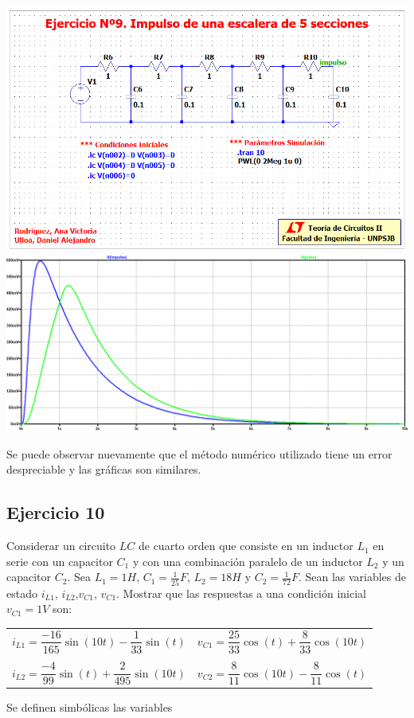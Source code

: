\documentclass[10pt,a4paper]{article} %
\begin{document}
\begin{center}
	\includegraphics[scale=0.5]{simulacion91}
	\includegraphics[scale=0.4]{simulacion92}

\end{center}
Se puede observar nuevamente que el método numérico utilizado tiene un error despreciable y las gráficas son similares. 
	\subsection{Ejercicio 10} Considerar un circuito $LC$ de cuarto orden que consiste en un inductor $L_1$ en serie con un capacitor $C_1$ y con una combinación paralelo de un inductor $L_2$ y un capacitor $C_2$. Sea $L_1=1H$, $C_1=\frac{1}{25}F$, $L_2=18H$ y $C_2=\frac{1}{72}F$. Sean las variables de estado $i_{L1}$, $i_{L2}$,$v_{C1}$, $v_{C1}$. Mostrar que las respuestas a una condición inicial $v_{C1}=1V$ son:
	\begin{center}
		\begin{tabular}{cc}
			$i_{L1}=\dfrac{-16}{165}\sin(10t)-\dfrac{1}{33}\sin(t)$& $v_{C1}=\dfrac{25}{33}\cos(t)+\dfrac{8}{33}\cos(10t)$\\
			&\\ 
			$i_{L2}=\dfrac{-4}{99}\sin(t)+\dfrac{2}{495}\sin(10t)$ & $v_{C2}=\dfrac{8}{11}\cos(10t)-\dfrac{8}{11}\cos(t)$\\
		\end{tabular} 
	\end{center}
\begin{par}
	\begin{flushleft}
		Se definen simbólicas las variables
	\end{flushleft}
\end{par}
\end{document}
